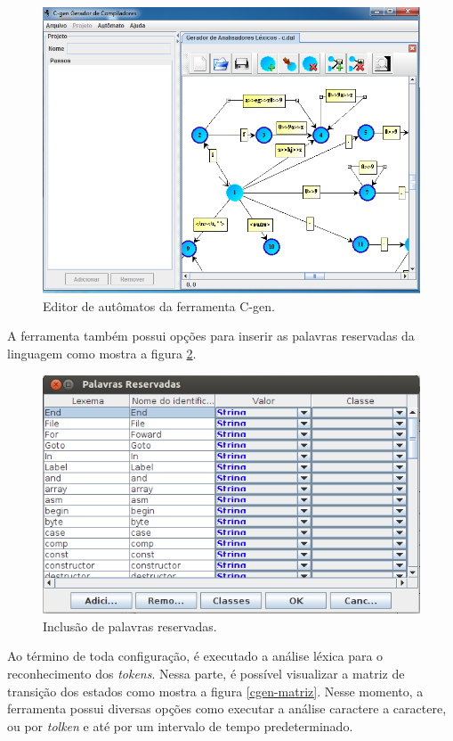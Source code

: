 \begin{figure}[ht!]
	\centering
	\includegraphics[scale=0.55]{imgs/cgen3.png}
	\caption{Editor de autômatos da ferramenta C-gen.}
	\label{cgen-automatos}
\end{figure}

A ferramenta também possui opções para inserir as palavras reservadas da linguagem como mostra a figura \ref{cgen-reservadas}.

\begin{figure}[ht!]
	\centering
	\includegraphics[scale=0.7]{imgs/cgen6.png}
	\caption{Inclusão de palavras reservadas.}
	\label{cgen-reservadas}
\end{figure}

Ao término de toda configuração, é executado a análise léxica para o reconhecimento dos \textit{tokens}. Nessa parte, é possível visualizar a matriz de transição dos estados como mostra a figura \ref{cgen-matriz}. Nesse momento, a ferramenta possui diversas opções como executar a análise  caractere a caractere, ou por \textit{tolken} e até por um intervalo de tempo predeterminado.

